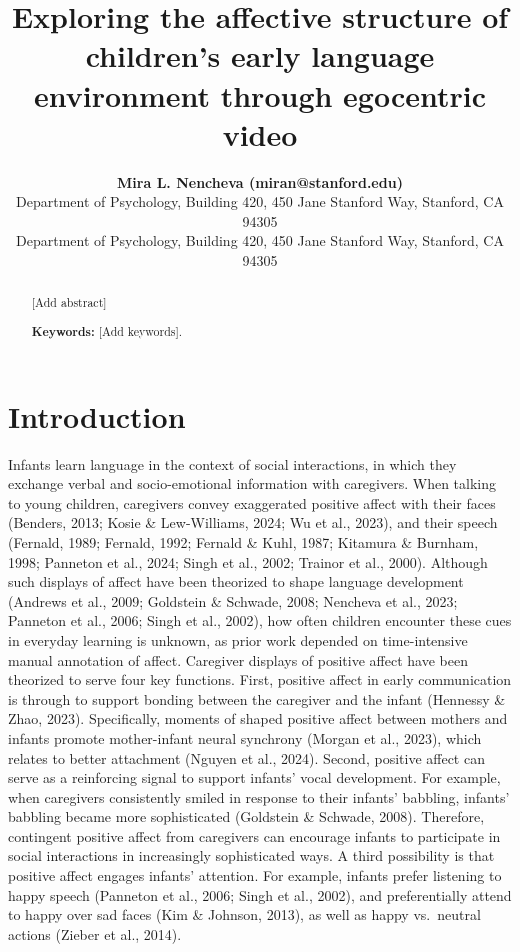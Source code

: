 \documentclass[10pt, letterpaper]{article}
\title{Exploring the affective structure of children's early language
environment through egocentric video}
\author{{\large \bf Mira L. Nencheva (miran@stanford.edu)} \\ Department of Psychology, Building 420, 450 Jane Stanford Way, Stanford, CA 94305 \AND {\large \bf Michael C. Frank (mcfrank@stanford.edu)} \\ Department of Psychology, Building 420, 450 Jane Stanford Way, Stanford, CA 94305}
\begin{document}
\maketitle

\begin{abstract}
{[}Add abstract{]}

\textbf{Keywords:}
{[}Add keywords{]}.
\end{abstract}

\section{Introduction}\label{introduction}

Infants learn language in the context of social interactions, in which
they exchange verbal and socio-emotional information with caregivers.
When talking to young children, caregivers convey exaggerated positive
affect with their faces (Benders, 2013; Kosie \& Lew-Williams, 2024; Wu
et al., 2023), and their speech (Fernald, 1989; Fernald, 1992; Fernald
\& Kuhl, 1987; Kitamura \& Burnham, 1998; Panneton et al., 2024; Singh
et al., 2002; Trainor et al., 2000). Although such displays of affect
have been theorized to shape language development (Andrews et al., 2009;
Goldstein \& Schwade, 2008; Nencheva et al., 2023; Panneton et al.,
2006; Singh et al., 2002), how often children encounter these cues in
everyday learning is unknown, as prior work depended on time-intensive
manual annotation of affect. Caregiver displays of positive affect have
been theorized to serve four key functions. First, positive affect in
early communication is through to support bonding between the caregiver
and the infant (Hennessy \& Zhao, 2023). Specifically, moments of shaped
positive affect between mothers and infants promote mother-infant neural
synchrony (Morgan et al., 2023), which relates to better attachment
(Nguyen et al., 2024). Second, positive affect can serve as a
reinforcing signal to support infants' vocal development. For example,
when caregivers consistently smiled in response to their infants'
babbling, infants' babbling became more sophisticated (Goldstein \&
Schwade, 2008). Therefore, contingent positive affect from caregivers
can encourage infants to participate in social interactions in
increasingly sophisticated ways. A third possibility is that positive
affect engages infants' attention. For example, infants prefer listening
to happy speech (Panneton et al., 2006; Singh et al., 2002), and
preferentially attend to happy over sad faces (Kim \& Johnson, 2013), as
well as happy vs.~neutral actions (Zieber et al., 2014).
\end{document}
